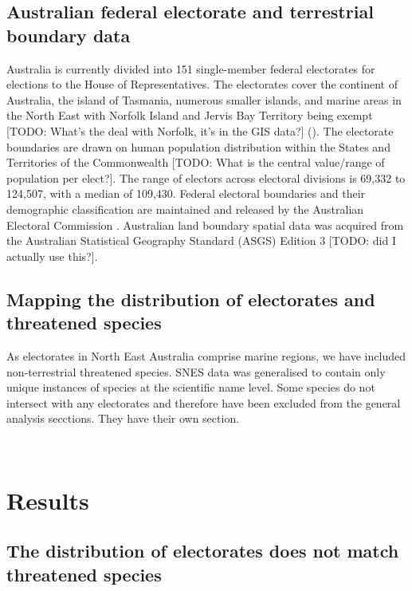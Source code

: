 \documentclass[a4paper,11pt]{article}
\begin{document}
\subsection{Australian federal electorate and terrestrial boundary data}

Australia is currently divided into 151 single-member federal electorates for elections to the House of Representatives. The electorates cover the continent of Australia, the island of Tasmania, numerous smaller islands, and marine areas in the North East with Norfolk Island and Jervis Bay Territory being exempt [TODO: What's the deal with Norfolk, it's in the GIS data?] (\cite{parliamentofaustraliaElectoralDivisions2018}). The electorate boundaries are drawn on human population distribution within the States and Territories of the Commonwealth [TODO: What is the central value/range of population per elect?]. The range of electors across electoral divisions is 69,332 to 124,507, with a median of 109,430. Federal electoral boundaries and their demographic classification are maintained and released by the Australian Electoral Commission \cite{australiaelectoralcomissionFederalElectoralBoundaries2019}. Australian land boundary spatial data was acquired from the Australian Statistical Geography Standard (ASGS) Edition 3 \cite{australianbureauofstatisticsAustralianStatisticalGeography2021} [TODO: did I actually use this?].

\subsection{Mapping the distribution of electorates and threatened species}
As electorates in North East Australia comprise marine regions, we have included non-terrestrial threatened species.
SNES data was generalised to contain only unique instances of species at the scientific name level.
Some species do not intersect with any electorates and therefore have been excluded from the general analysis secctions. They have their own section.

\\

\section{Results}

\subsection{The distribution of electorates does not match threatened species} 
\end{document}
